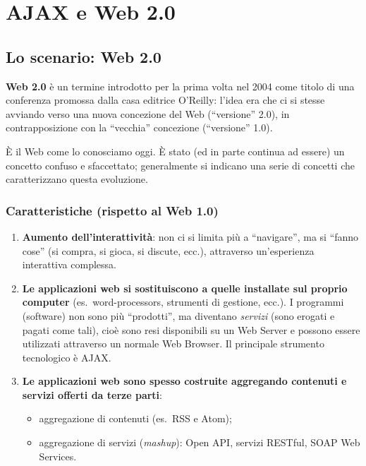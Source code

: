 \chapter{AJAX e Web 2.0}

\section{Lo scenario: Web 2.0}

\textbf{Web 2.0} è un termine introdotto per la prima volta nel 2004 come titolo di una conferenza promossa dalla casa editrice O'Reilly: l'idea era che ci si stesse avviando verso una nuova concezione del Web (``versione'' 2.0), in contrapposizione con la ``vecchia'' concezione (``versione'' 1.0).

È il Web come lo conosciamo oggi. È stato (ed in parte continua ad essere) un concetto confuso e sfaccettato; generalmente si indicano una serie di concetti che caratterizzano questa evoluzione.

\subsection{Caratteristiche (rispetto al Web 1.0)}

\begin{enumerate}
    \item \textbf{Aumento dell'interattività}: non ci si limita più a ``navigare'', ma si ``fanno cose'' (si compra, si gioca, si discute, ecc.), attraverso un'esperienza interattiva complessa.
    \item \textbf{Le applicazioni web si sostituiscono a quelle installate sul proprio computer} (es.\ word-processors, strumenti di gestione, ecc.). I programmi (software) non sono più ``prodotti'', ma diventano \textit{servizi} (sono erogati e pagati come tali), cioè sono resi disponibili su un Web Server e possono essere utilizzati attraverso un normale Web Browser. Il principale strumento tecnologico è AJAX.
    \item \textbf{Le applicazioni web sono spesso costruite aggregando contenuti e servizi offerti da terze parti}:
    \begin{itemize}
        \item aggregazione di contenuti (es.\ RSS e Atom);
        \item aggregazione di servizi (\textit{mashup}): Open API, servizi RESTful, SOAP Web Services.
    \end{itemize}
\end{enumerate}

